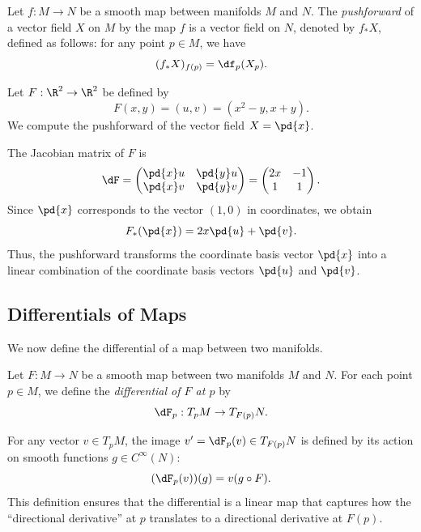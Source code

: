 \begin{definition}
  Let $f : M \to N$ be a smooth map between manifolds $M$ and $N$. The \emph{pushforward} of a vector field $X$ on $M$ by the map $f$ is a vector field on $N$, denoted by $f_*X$, defined as follows: for any point $p \in M$, we have
  \[%
    (f_*X)_{f(p)} = \df_p(X_p)
  .\]%
\end{definition}

\begin{example}
  Let $F : \R^2 \to \R^2$ be defined by
  \[%
    F(x,y) = (u,v) = (x^2 - y, x + y)
  .\]%
  We compute the pushforward of the vector field $X = \pd{x}$.

  The Jacobian matrix of $F$ is
  \[%
    \dF = \begin{pmatrix}
      \pd{x} u & \pd{y} u \\
      \pd{x} v & \pd{y} v \\
    \end{pmatrix}
    = \begin{pmatrix}
      2x & -1 \\
      1 & 1 \\
    \end{pmatrix}
  .\]%
  Since $\pd{x}$ corresponds to the vector $(1,0)$ in coordinates, we obtain
  \[%
    F_*(\pd{x}) = 2x \pd{u} + \pd{v}
  .\]%
  Thus, the pushforward transforms the coordinate basis vector $\pd{x}$ into a linear combination of the coordinate basis vectors $\pd{u}$ and $\pd{v}$.
\end{example}


\subsection{Differentials of Maps} We now define the differential of a map between two manifolds.
\begin{definition}
  Let $F : M \to N$ be a smooth map between two manifolds $M$ and $N$. For each point $p \in M$, we define the \emph{differential of $F$ at $p$} by
  \[%
    \dF_p : T_pM \to T_{F(p)}N
  .\]%
\end{definition}


For any vector $v \in T_pM$, the image $v' = \dF_p(v) \in T_{F(p)}N$ is defined by its action on smooth functions $g \in C^\infty(N)$:
\[%
  (\dF_p(v))(g) = v(g \circ F)
.\]%
This definition ensures that the differential is a linear map that captures how the ``directional derivative'' at $p$ translates to a directional derivative at $F(p)$.

